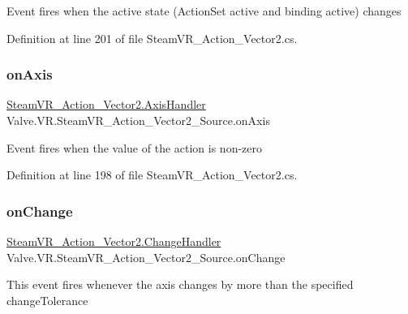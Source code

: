 Event fires when the active state (Action\+Set active and binding active) changes 



Definition at line 201 of file Steam\+V\+R\+\_\+\+Action\+\_\+\+Vector2.\+cs.

\mbox{\label{class_valve_1_1_v_r_1_1_steam_v_r___action___vector2___source_a629cea5168ed40fdbe22da1288178f81}} 
\subsubsection{\texorpdfstring{onAxis}{onAxis}}
{\footnotesize\ttfamily \mbox{\hyperlink{class_valve_1_1_v_r_1_1_steam_v_r___action___vector2_a11d8b99df804d185a33c7c60791ef426}{Steam\+V\+R\+\_\+\+Action\+\_\+\+Vector2.\+Axis\+Handler}} Valve.\+V\+R.\+Steam\+V\+R\+\_\+\+Action\+\_\+\+Vector2\+\_\+\+Source.\+on\+Axis}



Event fires when the value of the action is non-\/zero 



Definition at line 198 of file Steam\+V\+R\+\_\+\+Action\+\_\+\+Vector2.\+cs.

\mbox{\label{class_valve_1_1_v_r_1_1_steam_v_r___action___vector2___source_a6bc09c8981144653425cee8720375ee3}} 
\subsubsection{\texorpdfstring{onChange}{onChange}}
{\footnotesize\ttfamily \mbox{\hyperlink{class_valve_1_1_v_r_1_1_steam_v_r___action___vector2_ad390de62736aedd5be93238b1840ffec}{Steam\+V\+R\+\_\+\+Action\+\_\+\+Vector2.\+Change\+Handler}} Valve.\+V\+R.\+Steam\+V\+R\+\_\+\+Action\+\_\+\+Vector2\+\_\+\+Source.\+on\+Change}



This event fires whenever the axis changes by more than the specified change\+Tolerance 




